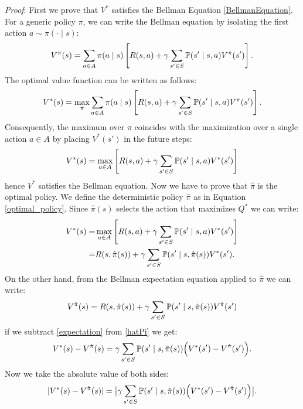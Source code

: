 \documentclass[10pt, a4paper]{report}
\begin{document}
\noindent\textit{Proof}: First we prove that $V^*$ satisfies the Bellman Equation \eqref{BellmanEquation}.
For a generic policy $\pi$, we can write the Bellman equation by isolating the first action $a\sim\pi(\cdot \mid s)$:\begin{equation}
    V^\pi(s) = \sum_{a \in {A}} \pi(a \mid s) \left[ R(s, a) + \gamma \sum_{s' \in {S}} {\mathbb P}(s' \mid s, a) V^\pi(s') \right].
\end{equation}
The optimal value function can be written as follows:\begin{equation}
    V^*(s)=\max_\pi\sum_{a \in {A}} \pi(a \mid s) \left[ R(s, a) + \gamma \sum_{s' \in {S}} {\mathbb P}(s' \mid s, a) V^\pi(s') \right].
\end{equation}
Consequently, the maximum over $\pi$ coincides with the maximization over a single action $a \in {A}$ by placing $V^*(s')$ in the future steps:\begin{equation}
    V^*(s) = \max_{a \in {A}} \left[ R(s, a) + \gamma \sum_{s' \in {S}} {\mathbb P}(s' \mid s, a) V^*(s') \right]
\end{equation}
hence $V^*$ satisfies the Bellman equation. Now we have to prove that $\hat \pi$ is the optimal policy. We define the deterministic policy $\hat\pi$ as in Equation \eqref{optimal_policy}. Since $\hat\pi(s)$ selects the action that maximizes $Q^*$ we can write:\begin{align}
    V^*(s) =&\max_{a \in {A}} \left[ R(s, a) + \gamma \sum_{s' \in {S}} {\mathbb P}(s' \mid s, a) V^*(s') \right]\\ =&R(s, \hat{\pi}(s)) + \gamma \sum_{s' \in {S}} {\mathbb P}(s' \mid s, \hat{\pi}(s)) V^*(s').\label{hatPi}
\end{align}
On the other hand, from the Bellman expectation equation applied to $\hat \pi$ we can write:\begin{equation}\label{expectation}
    V^{\hat{\pi}}(s) = R(s, \hat{\pi}(s)) + \gamma \sum_{s' \in {S}} {\mathbb P}(s' \mid s, \hat{\pi}(s)) V^{\hat{\pi}}(s')
\end{equation}
if we subtract \eqref{expectation} from \eqref{hatPi} we get:\begin{equation}
    V^*(s) - V^{\hat{\pi}}(s) = \gamma \sum_{s' \in {S}} {\mathbb P}(s' \mid s, \hat{\pi}(s)) \Big( V^*(s') - V^{\hat{\pi}}(s') \Big).
\end{equation}
Now we take the absolute value of both sides:
\begin{equation}
    |V^*(s) - V^{\hat{\pi}}(s)| = \big\vert{}\gamma \sum_{s' \in {S}} {\mathbb P}(s' \mid s, \hat{\pi}(s)) \Big( V^*(s') - V^{\hat{\pi}}(s') \Big)\big\vert{}.
\end{equation}
\end{document}
